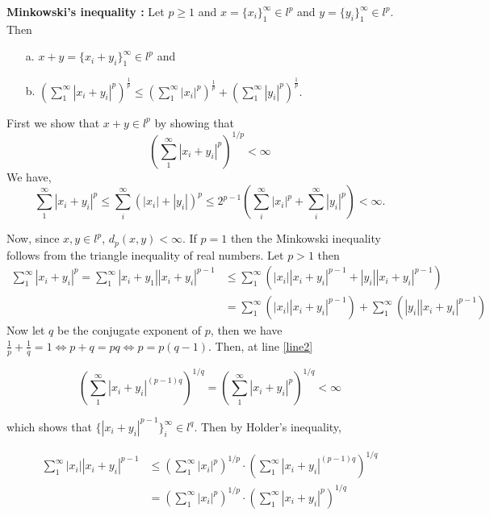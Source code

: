 
\begin{solution}
    
    \textbf{Minkowski's inequality :} Let $p\geq 1$ and
    $x=\{x_{i}\}_{1}^{\infty} \in l^p$ and
    $y=\{y_{i}\}_{1}^{\infty} \in l^p$. Then

    \begin{enumerate}
        \item[a.]
              $x+y =
              \{x_{i} + y_{i}\}_{1}^{\infty} \in l^{p}$ and
        \item[b.]
        $\left(\sum_{1}^{\infty}{|x_{i} + y_{i}|^p}\right)^
        \frac{1}{p}\leq
        \left(\sum_{1}^{\infty}{|x_{i}|^{p}}\right)^{\frac{1}{p}}
        +
        \left(\sum_{1}^{\infty}{|y_{i}|^{p}}\right)^{\frac{1}{p}}.$
    \end{enumerate}
    First we show that $x+y\in l^p$ by showing that
    $$\left(\sum_{1}^{\infty}{|x_{i} + y_{i}|^p}\right)^{1/p}
    <\infty$$
    We have,
    $$\sum_{1}^{\infty}{|x_{i} + y_{i}|^p}\leq
    \sum_i^{\infty}{\left(|x_i|+|y_i|\right)^p}\leq
    2^{p-1}\left(\sum_i^{\infty}{|x_i|^p}+
    \sum_i^{\infty}{|y_i|^p}\right)<\infty.$$

    Now, since $x,y\in l^p$, $d_p(x,y)<\infty$.
    If $p=1$ then the Minkowski inequality follows from the
    triangle inequality of real numbers. Let $p>1$ then
    \begin{align}\sum_{1}^{\infty}{|x_{i} + y_{i}|^p}=
    \sum_{1}^{\infty}{|x_i+y_1||x_{i} + y_{i}|^{p-1}}
    &\leq\sum_{1}^{\infty}{\left(|x_i||x_{i} + y_{i}|^{p-1}
    +|y_i||x_{i} + y_{i}|^{p-1}\right)}\label{line1}\\
    &=\sum_{1}^{\infty}{\left(|x_i||x_{i} + y_{i}|^{p-1}\right)}
    +\sum_{1}^{\infty}{\left(|y_i||x_{i} + y_{i}|^{p-1}\right)}
    \label{line2}
    \end{align}
    Now let $q$ be the conjugate exponent of $p$, then we have
    $\frac{1}{p}+\frac{1}{q}=1 \iff p+q=pq \iff p=p(q-1)$. Then,
    at line
    \ref{line2}

    $$\left(\sum_{1}^{\infty}{|x_i+y_i|^{(p-1)q}}\right)^{1/q}
    =\left(\sum_{1}^{\infty}{|x_i+y_i|^{p}}\right)^{1/q}
    <\infty$$

    which shows that $\{|x_i+y_i|^{p-1}\}_i^{\infty}\in
    l^q$. Then by Holder's inequality,

    \begin{align}\sum_{1}^{\infty}{|x_i||x_{i} + y_{i}|^{p-1}}
      &\leq \left(\sum_{1}^{\infty}{|x_i|^p}\right)^{1/p}\cdot
      \left(\sum_{1}^{\infty}{|x_i+y_i|^{(p-1)q}}\right)^{1/q}\\
      &=\left(\sum_{1}^{\infty}{|x_i|^p}\right)^{1/p}\cdot
      \left(\sum_{1}^{\infty}{|x_i+y_i|^{p}}\right)^{1/q}
      \label{line4}
    \end{align}


\end{solution}
